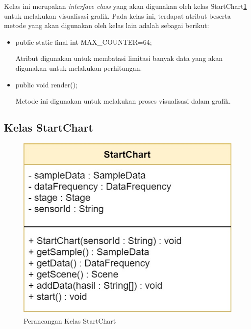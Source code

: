 Kelas ini merupakan \textit{interface class} yang akan digunakan oleh kelas StartChart\ref{fig:controller_startChart} untuk melakukan visualisasi grafik. Pada kelas ini, terdapat atribut beserta metode yang akan digunakan oleh kelas lain adalah sebagai berikut:

\begin{itemize}
    \item public static final int MAX\_COUNTER=64;
    
    Atribut digunakan untuk membatasi limitasi banyak data yang akan digunakan untuk melakukan perhitungan.
    
    \item public void render();
    
    Metode ini digunakan untuk melakukan proses visualisasi dalam grafik.
\end{itemize}


\subsection{Kelas StartChart}
\begin{figure}[H] 
	\centering  
	\includegraphics[scale=0.35]{Gambar/Controller Package/Controller-StartChart.jpg}
	\caption[Perancangan Kelas StartChart]{Perancangan Kelas StartChart}
	\label{fig:controller_startChart} 
\end{figure}

